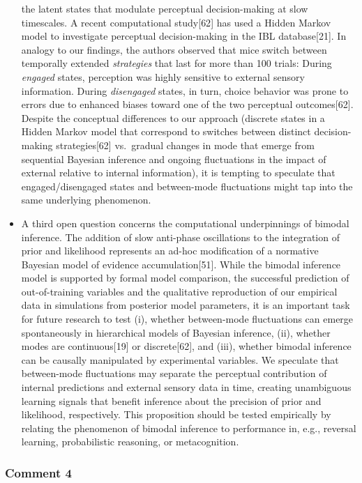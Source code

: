 \documentclass[
]{article}
\begin{document}
\begin{itemize}
  the latent states that modulate perceptual decision-making at slow
  timescales. A recent computational study{[}62{]} has used a Hidden
  Markov model to investigate perceptual decision-making in the IBL
  database{[}21{]}. In analogy to our findings, the authors observed
  that mice switch between temporally extended \emph{strategies} that
  last for more than 100 trials: During \emph{engaged} states,
  perception was highly sensitive to external sensory information.
  During \emph{disengaged} states, in turn, choice behavior was prone to
  errors due to enhanced biases toward one of the two perceptual
  outcomes{[}62{]}. Despite the conceptual differences to our approach
  (discrete states in a Hidden Markov model that correspond to switches
  between distinct decision-making strategies{[}62{]} vs.~gradual
  changes in mode that emerge from sequential Bayesian inference and
  ongoing fluctuations in the impact of external relative to internal
  information), it is tempting to speculate that engaged/disengaged
  states and between-mode fluctuations might tap into the same
  underlying phenomenon.
\item
  A third open question concerns the computational underpinnings of
  bimodal inference. The addition of slow anti-phase oscillations to the
  integration of prior and likelihood represents an ad-hoc modification
  of a normative Bayesian model of evidence accumulation{[}51{]}. While
  the bimodal inference model is supported by formal model comparison,
  the successful prediction of out-of-training variables and the
  qualitative reproduction of our empirical data in simulations from
  posterior model parameters, it is an important task for future
  research to test (i), whether between-mode fluctuations can emerge
  spontaneously in hierarchical models of Bayesian inference, (ii),
  whether modes are continuous{[}19{]} or discrete{[}62{]}, and (iii),
  whether bimodal inference can be causally manipulated by experimental
  variables. We speculate that between-mode fluctuations may separate
  the perceptual contribution of internal predictions and external
  sensory data in time, creating unambiguous learning signals that
  benefit inference about the precision of prior and likelihood,
  respectively. This proposition should be tested empirically by
  relating the phenomenon of bimodal inference to performance in, e.g.,
  reversal learning, probabilistic reasoning, or metacognition.
\end{itemize}

\hypertarget{comment-4-1}{%
\subsubsection{Comment 4}\label{comment-4-1}}
\end{document}
